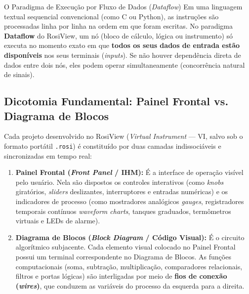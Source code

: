\documentclass[11pt,a4paper]{article}
\begin{document}
\begin{didatictip}{O Paradigma de Execução por Fluxo de Dados (\textit{Dataflow})}
Em uma linguagem textual sequencial convencional (como C ou Python), as instruções são processadas linha por linha na ordem em que foram escritas. No paradigma \textbf{Dataflow} do RosiView, um nó (bloco de cálculo, lógica ou instrumento) só executa no momento exato em que \textbf{todos os seus dados de entrada estão disponíveis} nos seus terminais (\textit{inputs}). Se não houver dependência direta de dados entre dois nós, eles podem operar simultaneamente (concorrência natural de sinais).
\end{didatictip}

\subsection{Dicotomia Fundamental: Painel Frontal vs. Diagrama de Blocos}
Cada projeto desenvolvido no RosiView (\textit{Virtual Instrument} --- VI, salvo sob o formato portátil \texttt{.rosi}) é constituído por duas camadas indissociáveis e sincronizadas em tempo real:
\begin{enumerate}
    \item \textbf{Painel Frontal (\textit{Front Panel} / IHM):} É a interface de operação visível pelo usuário. Nela são dispostos os controles interativos (como \textit{knobs} giratórios, \textit{sliders} deslizantes, interruptores e entradas numéricas) e os indicadores de processo (como mostradores analógicos \textit{gauges}, registradores temporais contínuos \textit{waveform charts}, tanques graduados, termômetros virtuais e LEDs de alarme).
    \item \textbf{Diagrama de Blocos (\textit{Block Diagram} / Código Visual):} É o circuito algorítmico subjacente. Cada elemento visual colocado no Painel Frontal possui um terminal correspondente no Diagrama de Blocos. As funções computacionais (soma, subtração, multiplicação, comparadores relacionais, filtros e portas lógicas) são interligadas por meio de \textbf{fios de conexão (\textit{wires})}, que conduzem as variáveis do processo da esquerda para a direita.
\end{enumerate}
\end{document}
